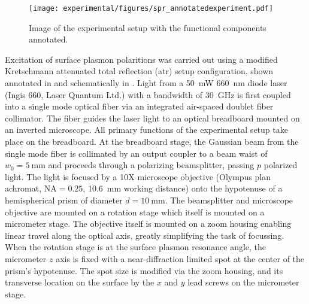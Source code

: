 \begin{figure}[ht]
 \centering
 \texttt{[image: experimental/figures/spr\_annotatedexperiment.pdf]}
 \caption{Image of the experimental setup with the functional
  components annotated.}
\label{fig:experimentalpicture}
\end{figure}

Excitation of surface plasmon polaritions was carried out using a modified
Kretschmann attenuated total reflection (\gls{atr}) setup configuration, shown
annotated in  and schematically in
.  Light from a \SI{50}{\milli\watt}
\SI{660}{\nano\meter} diode laser (Ingis 660, Laser Quantum Ltd.) with
a bandwidth of \SI{30}{\giga\hertz} is first coupled into a single mode
optical fiber via an integrated air-spaced doublet fiber collimator.  The
fiber guides the laser light to an optical breadboard mounted on an inverted
microscope.  All primary functions of the experimental setup take place on the
breadboard.  At the breadboard stage, the Gaussian beam from the single mode
fiber is collimated by an output coupler to a beam waist of
$w_0=\SI{5}{\milli\meter}$ and proceeds through a polarizing beamsplitter,
passing $p$ polarized light.  The light is focused by a 10X microscope
objective (Olympus plan achromat, $\mathrm{NA}=0.25$, \SI{10.6}{\milli\meter}
working distance) onto the hypotenuse of a hemispherical prism of diameter
$d=\SI{10}{\milli\meter}$.  The beamsplitter and microscope objective are
mounted on a rotation stage which itself is mounted on a micrometer stage.
The objective itself is mounted on a zoom housing enabling linear travel along
the optical axis, greatly simplifying the task of focussing.  When the
rotation stage is at the surface plasmon resonance angle, the micrometer $z$
axis is fixed with a near-diffraction limited spot at the center of the
prism's hypotenuse.  The spot size is modified via the zoom housing, and its
transverse location on the surface by the $x$ and $y$ lead screws on the
micrometer stage.

